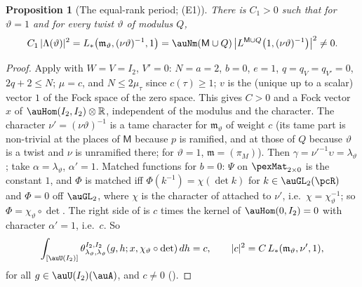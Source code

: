 \documentclass[10pt]{amsart}
\newtheorem{proposition}[theorem]{Proposition}
\theoremstyle{definition}
\theoremstyle{remark}
\newcommand{\R}{\mathbb R}
\begin{document}
\begin{proposition}[The equal-rank period; (E1)]\label{pex:E1}
There is $C_1>0$ such that for $\vartheta=1$ and for every twist $\vartheta$ of modulus $Q$,
\[
C_1\,|\Lambda(\vartheta)|^2=L_*\bigl(\mathfrak m_\vartheta,(\nu\vartheta)^{-1},1\bigr)=\auNm(\mathsf M\cup Q)
\,\bigl|L^{\mathsf M\cup Q}\bigl(1,(\nu\vartheta)^{-1}\bigr)\bigr|^2\ne0 .
\]
\end{proposition}
\begin{proof}
Apply {\cite[Theorem~3.2]{P53}} with $W=V=I_2$, $V'=0$: $N=a=2$, $b=0$, $e=1$, $q=q_V=q_{V'}=0$, $2q+2\le N$;
$\mu=c$, and $N\le2\mu_\tau$ since $c(\tau)\ge1$; $v$ is the (unique up to a scalar) vector $1$ of the
Fock space of the zero space. This gives $C>0$ and a Fock vector $x$ of $\auHom(I_2,I_2)\otimes\R$,
independent of the modulus and the character. The character $\nu'=(\nu\vartheta)^{-1}$ is a tame
character for $\mathfrak m_\vartheta$ of weight $c$ (its tame part is non-trivial at the places of
$\mathsf M$ because $p$ is ramified, and at those of $Q$ because $\vartheta$ is a twist and $\nu$ is
unramified there; for $\vartheta=1$, $\mathfrak m=(\pi_M)$). Then $\gamma=\nu'^{-1}\upsilon=\lambda_\vartheta$;
take $\alpha=\lambda_\vartheta$, $\alpha'=1$. Matched functions for $b=0$: $\Psi$ on $\pexMat_{2\times0}$
is the constant $1$, and $\Phi$ is matched iff $\Phi(k^{-1})=\chi(\det k)$ for $k\in\auGL_2(\pcR)$ and
$\Phi=0$ off $\auGL_2$, where $\chi$ is the character of {\cite[Definition~3.1]{P53}} attached to
$\nu'$, i.e.\ $\chi=\chi_\vartheta^{-1}$; so $\Phi=\chi_\vartheta\circ\det$. The right side of
{\cite[(12)]{P53}} is $c$ times the kernel of $\auHom(0,I_2)=0$ with character $\alpha'=1$, i.e.\ $c$. So
\begin{equation}\label{pex:eq-E1}
\int_{[\auU(I_2)]}\theta^{I_2,I_2}_{\lambda_\vartheta,\lambda_\vartheta}(g,h;x,\chi_\vartheta\circ\det)\,dh=c,
\qquad|c|^2=C\,L_*(\mathfrak m_\vartheta,\nu',1),
\end{equation}
for all $g\in\auU(I_2)(\auA)$, and $c\ne0$ ({\cite[Corollary~3.4]{P53}}).


\end{proof}
\end{document}

